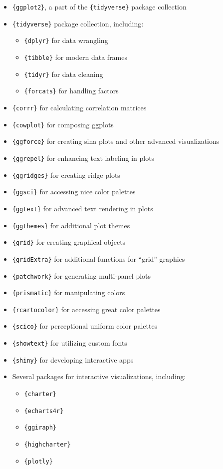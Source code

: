 \documentclass[
  letterpaper,
]{scrbook}
\providecommand{\tightlist}{%
  \setlength{\itemsep}{0pt}\setlength{\parskip}{0pt}}\usepackage{longtable,booktabs,array}
\begin{document}
\begin{itemize}
\tightlist
\item
  \texttt{\{ggplot2\}}, a part of the \texttt{\{tidyverse\}} package
  collection
\item
  \texttt{\{tidyverse\}} package collection, including:

  \begin{itemize}
  \tightlist
  \item
    \texttt{\{dplyr\}} for data wrangling
  \item
    \texttt{\{tibble\}} for modern data frames
  \item
    \texttt{\{tidyr\}} for data cleaning
  \item
    \texttt{\{forcats\}} for handling factors
  \end{itemize}
\item
  \texttt{\{corrr\}} for calculating correlation matrices
\item
  \texttt{\{cowplot\}} for composing ggplots
\item
  \texttt{\{ggforce\}} for creating sina plots and other advanced
  visualizations
\item
  \texttt{\{ggrepel\}} for enhancing text labeling in plots
\item
  \texttt{\{ggridges\}} for creating ridge plots
\item
  \texttt{\{ggsci\}} for accessing nice color palettes
\item
  \texttt{\{ggtext\}} for advanced text rendering in plots
\item
  \texttt{\{ggthemes\}} for additional plot themes
\item
  \texttt{\{grid\}} for creating graphical objects
\item
  \texttt{\{gridExtra\}} for additional functions for ``grid'' graphics
\item
  \texttt{\{patchwork\}} for generating multi-panel plots
\item
  \texttt{\{prismatic\}} for manipulating colors
\item
  \texttt{\{rcartocolor\}} for accessing great color palettes
\item
  \texttt{\{scico\}} for perceptional uniform color palettes
\item
  \texttt{\{showtext\}} for utilizing custom fonts
\item
  \texttt{\{shiny\}} for developing interactive apps
\item
  Several packages for interactive visualizations, including:

  \begin{itemize}
  \tightlist
  \item
    \texttt{\{charter\}}
  \item
    \texttt{\{echarts4r\}}
  \item
    \texttt{\{ggiraph\}}
  \item
    \texttt{\{highcharter\}}
  \item
    \texttt{\{plotly\}}
  \end{itemize}
\end{itemize}
\end{document}
